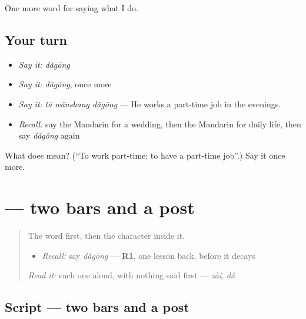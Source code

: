 \begin{grammarlens}[title={What you've built}]
One more word for saying what I do.
\end{grammarlens}

\subsection*{Your turn}
\begin{itemize}
\raggedright
  \item \emph{Say it:} \emph{dǎgōng}
  \item \emph{Say it:} \emph{dǎgōng}, once more
  \item \emph{Say it:} \emph{tā wǎnshang dǎgōng} — He works a part-time job in the evenings.
  \item \emph{Recall:} say the Mandarin for a wedding, then the Mandarin for daily life, then say \emph{dǎgōng} again
\end{itemize}

\begin{tcolorbox}[breakable,colback=teal!4,colframe=teal!35!black,title={Before you move on}]
What does  mean? (\textquotedblleft{}To work part-time; to have a part-time job\textquotedblright{}.) Say it once more.
\end{tcolorbox}
\section[\texorpdfstring{\zh{工} (gōng)}{工 (gōng)}]{ — two bars and a post}

\label{lesson:ZH-W255-gong-work}



\begin{quote}
The word first, then the character inside it.

\begin{itemize}
\raggedright
  \item \emph{Recall:} say \emph{dǎgōng} — \textbf{R1}, one lesson back, before it decays
\end{itemize}

\begin{quote}
 
\end{quote}

\emph{Read it:} each one aloud, with nothing said first — \emph{zài}, \emph{dǎ}
\end{quote}

\subsection*{Script — two bars and a post}

